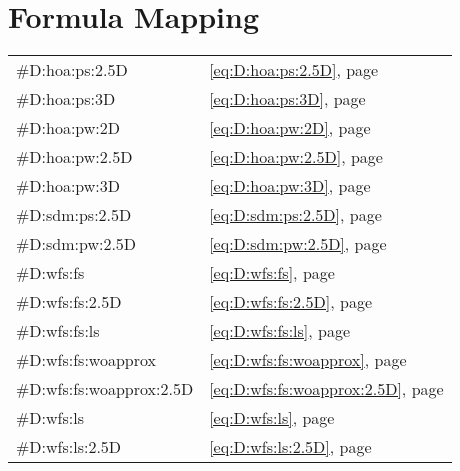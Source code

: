 \def \GITHUB {\GITHUBBASE/03_formula}

\chapter{Formula Mapping}
\label{cha:formula}
%

\begin{tabular}{ll}
    \#D:hoa:ps:2.5D           & \eqref{eq:D:hoa:ps:2.5D},             page \pageref{eq:D:hoa:ps:2.5D} \\
    \#D:hoa:ps:3D             & \eqref{eq:D:hoa:ps:3D},               page \pageref{eq:D:hoa:ps:3D} \\
    \#D:hoa:pw:2D             & \eqref{eq:D:hoa:pw:2D},               page \pageref{eq:D:hoa:pw:2D} \\
    \#D:hoa:pw:2.5D           & \eqref{eq:D:hoa:pw:2.5D},             page \pageref{eq:D:hoa:pw:2.5D} \\
    \#D:hoa:pw:3D             & \eqref{eq:D:hoa:pw:3D},               page \pageref{eq:D:hoa:pw:3D} \\
    \#D:sdm:ps:2.5D           & \eqref{eq:D:sdm:ps:2.5D},             page \pageref{eq:D:sdm:ps:2.5D} \\
    \#D:sdm:pw:2.5D           & \eqref{eq:D:sdm:pw:2.5D},             page \pageref{eq:D:sdm:pw:2.5D} \\
    \#D:wfs:fs                & \eqref{eq:D:wfs:fs},                  page \pageref{eq:D:wfs:fs} \\
    \#D:wfs:fs:2.5D           & \eqref{eq:D:wfs:fs:2.5D},             page \pageref{eq:D:wfs:fs:2.5D} \\
    \#D:wfs:fs:ls             & \eqref{eq:D:wfs:fs:ls},               page \pageref{eq:D:wfs:fs:ls} \\
    \#D:wfs:fs:woapprox       & \eqref{eq:D:wfs:fs:woapprox},         page \pageref{eq:D:wfs:fs:woapprox} \\
    \#D:wfs:fs:woapprox:2.5D  & \eqref{eq:D:wfs:fs:woapprox:2.5D},    page \pageref{eq:D:wfs:fs:woapprox:2.5D} \\
    \#D:wfs:ls                & \eqref{eq:D:wfs:ls},                  page \pageref{eq:D:wfs:ls} \\
    \#D:wfs:ls:2.5D           & \eqref{eq:D:wfs:ls:2.5D},             page \pageref{eq:D:wfs:ls:2.5D} \\

\end{tabular}
